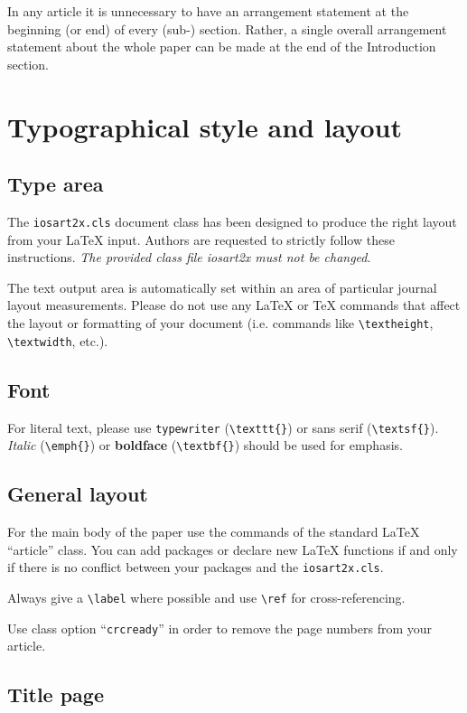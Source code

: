 \documentclass[bsi]{iosart2x}
\begin{document}
In any article it is unnecessary to have an arrangement statement at the beginning (or end) of every \mbox{(sub-)} section.
Rather, a single overall arrangement statement about the whole paper can be made at the end of the Introduction section.


\section{Typographical style and layout}

\subsection{Type area}

The \texttt{iosart2x.cls} document class has been designed to produce
the right layout from your \LaTeX{} input. Authors are requested to
strictly follow these instructions. \emph{The provided class file
iosart2x must not be changed}.

The text output area is automatically set within an area of particular journal layout measurements.
Please do not use any
\LaTeX{} or \TeX{} commands that affect the layout or formatting of
your document (i.e. commands like \verb|\textheight|,
\verb|\textwidth|, etc.).

\subsection{Font}

For literal text, please use
\texttt{type\-writer} (\verb|\texttt{}|)
or \textsf{sans serif} (\verb|\textsf{}|). \emph{Italic} (\verb|\emph{}|)
or \textbf{boldface} (\verb|\textbf{}|) should be used for emphasis.


\subsection{General layout}

For the main
body of the paper use the commands of the standard \LaTeX{}
``article'' class. You can add packages or declare new \LaTeX{}
functions if and only if there is no conflict between your packages
and the \texttt{iosart2x.cls}.

Always give a \verb|\label| where possible and use \verb|\ref| for cross-referencing.

Use class option ``\texttt{crcready}'' in order to remove the page numbers from your article.


\subsection{Title page}
\end{document}
